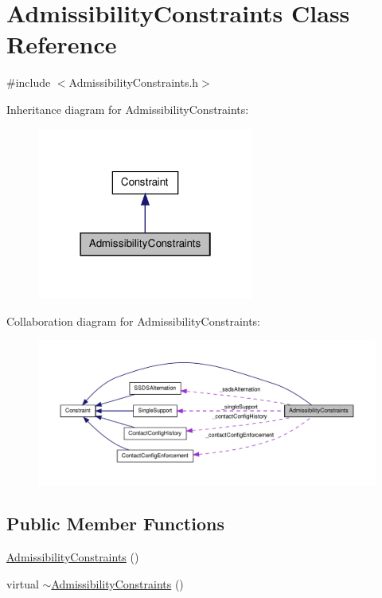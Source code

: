 \hypertarget{classAdmissibilityConstraints}{\section{\-Admissibility\-Constraints \-Class \-Reference}
\label{classAdmissibilityConstraints}
}


{\ttfamily \#include $<$\-Admissibility\-Constraints.\-h$>$}



\-Inheritance diagram for \-Admissibility\-Constraints\-:
\nopagebreak
\begin{figure}[H]
\begin{center}
\leavevmode
\includegraphics[width=202pt]{classAdmissibilityConstraints__inherit__graph}
\end{center}
\end{figure}


\-Collaboration diagram for \-Admissibility\-Constraints\-:
\nopagebreak
\begin{figure}[H]
\begin{center}
\leavevmode
\includegraphics[width=350pt]{classAdmissibilityConstraints__coll__graph}
\end{center}
\end{figure}
\subsection*{\-Public \-Member \-Functions}
\begin{DoxyCompactItemize}
\item 
\hyperlink{classAdmissibilityConstraints_a43220ed86e4b8b841e24e39fc91628a6}{\-Admissibility\-Constraints} ()
\item 
virtual \hyperlink{classAdmissibilityConstraints_a7daa761292772da2f01084584fc46736}{$\sim$\-Admissibility\-Constraints} ()
\end{DoxyCompactItemize}

